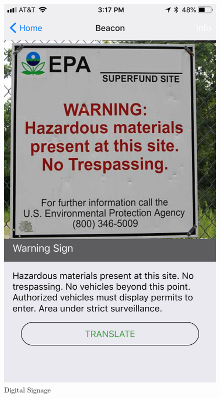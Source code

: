 \documentclass[12pt]{article}
\begin{document}
 \begin{figure} [H]
\centering
\begin{minipage}{.5\textwidth}
  \centering
  \includegraphics[width=0.9\linewidth]{media/beacon.PNG}
  \caption{Digital Signage}
  \label{fig:beaconDetails}
\end{minipage}%
\begin{minipage}{.5\textwidth}
  \centering

\end{minipage}
\end{figure}
\end{document}

